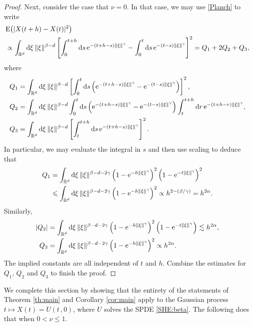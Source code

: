 \documentclass[reqno]{amsart}
\newcommand{\<}{\langle}
\renewcommand{\>}{\rangle}
\newcommand{\R}{\mathbb{R}}
\newcommand{\E}{\mathrm{E}}
\newcommand{\1}{\mathbb{1}}
\renewcommand{\d}{{\rm d}}
\newcommand{\e}{{\rm e}}
\renewcommand{\le}{\leqslant}
\theoremstyle{definition}
\numberwithin{equation}{section}
\begin{document}
\begin{proof}
Next, consider the case that $\nu = 0$.
In that case, we may use \eqref{Planch} to write
\begin{align*}
	&\E\big(|X(t+h)-X(t)|^2\big)\\
	&\propto \int_{\R^d}  \d \xi \, \|\xi\|^{\beta-d} \left[ 
		\int_0^{t+h} \d s \, \e^{-(t+h-s)\|\xi\|^\gamma} - 
		\int_0^t \d s\, \e^{-(t-s)\|\xi\|^\gamma} \right]^2
		= Q_1+2Q_2+Q_3,
\end{align*}
where
\begin{align*}
	Q_1 &= \int_{\R^d} \d \xi \, \|\xi\|^{\beta-d} \left[ \int_0^t \d s  
		\left( \e^{-(t+h-s)\|\xi\|^\gamma} - \e^{-(t-s)\|\xi\|^\gamma} 
		\right) \right]^2,\\
	Q_2 &= \int_{\R^d} \d \xi \, \|\xi\|^{\beta-d} \int_0^t \d s 
		\left( \e^{-(t+h-s)\|\xi\|^\gamma} - \e^{-(t-s)\|\xi\|^\gamma} \right) 
		\int_t^{t+h} \d r \, \e^{-(t+h-r)\|\xi\|^\gamma},\\
	Q_3 &= \int_{\R^d} \d \xi \, \|\xi\|^{\beta-d} \left[ \int_t^{t+h} \d s \, 
		\e^{-(t+h-s)\|\xi\|^\gamma} \right]^2.
\end{align*}
In particular, we may evaluate the integral in $s$ and then use scaling to deduce that
\begin{align*}
	Q_1 &= \int_{\R^d}\d \xi\,\|\xi\|^{\beta-d-2\gamma} 
		\left( 1 - \e^{-h\|\xi\|^\gamma} \right)^2 \left( 1 - \e^{-t\|\xi\|^\gamma} \right)^2\\
	& \le \int_{\R^d}\d \xi\, \|\xi\|^{\beta-d-2\gamma} 
		\left( 1 - \e^{-h\|\xi\|^\gamma} \right)^2 \propto h^{2-(\beta/\gamma)} = h^{2\alpha}.
\end{align*}
Similarly,
\begin{align*}
	|Q_2| &= \int_{\R^d}\d \xi\, \|\xi\|^{\beta-d-2\gamma} 
		\left( 1 - \e^{-h\|\xi\|^\gamma} \right)^2 \left( 1 - \e^{-t\|\xi\|^\gamma} \right)
		\lesssim h^{2\alpha},\\
	Q_3 &= \int_{\R^d}\d \xi\,\|\xi\|^{\beta-d-2\gamma} 
		\left( 1 - \e^{-h\|\xi\|^\gamma} \right)^2 \propto h^{2\alpha}.
\end{align*}
The implied constants are all independent of $t$ and $h$.
Combine the estimates for $Q_1$, $Q_2$ and $Q_3$ to finish the proof.
\end{proof}

We complete this section by showing that the entirety of the statements of
Theorem \ref{th:main} and Corollary \ref{cor:main} apply
to the Gaussian process $t\mapsto X(t)=U(t\,,0)$,
where $U$ solves the SPDE \eqref{SHE:beta}. 
The following does that when $0<\nu\le 1$.
\end{document}

